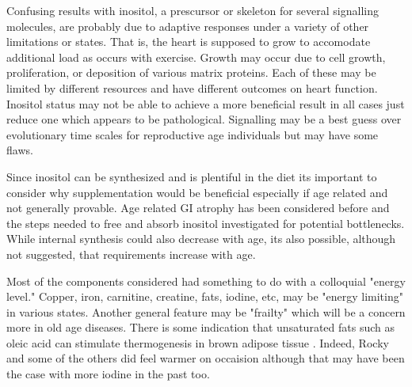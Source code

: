
Confusing results with inositol, a prescursor or skeleton for
several signalling molecules, are probably due to adaptive
responses under a variety of other limitations or states.
That is, the heart is supposed to grow to accomodate additional
load as occurs with exercise. Growth may occur due to cell growth,
proliferation, or deposition of various matrix proteins. Each of
these may be limited by different resources and have different outcomes
on heart function. Inositol status may not be able to achieve a more
beneficial result in all cases just reduce one which appears to be
pathological. Signalling may be a best guess over evolutionary time
scales for reproductive age individuals but may have some flaws. 


Since inositol can be synthesized and is plentiful in the diet its
important to consider why supplementation would be beneficial especially
if age related and not generally provable. Age related GI atrophy
has been considered before 
and the steps needed to free and absorb inositol investigated for potential
bottlenecks. While internal synthesis could also decrease with age, 
its also possible, although not suggested,  that requirements increase with
age.  

Most of the components considered had something to do with 
a colloquial "energy level." Copper, iron, carnitine, creatine,
fats, iodine, etc, may be "energy limiting" in various states.
Another general feature may be "frailty" which will be a concern
more in old age diseases. 
There is some indication that unsaturated fats such as oleic acid
can stimulate thermogenesis in brown adipose tissue
\cite{PMC9866012}. Indeed, Rocky and some of the others did 
feel warmer on occaision although that may have been the case with
more iodine in the past too. 

